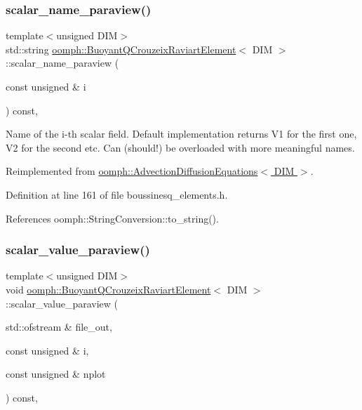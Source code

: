 \subsubsection{\texorpdfstring{scalar\+\_\+name\+\_\+paraview()}{scalar\_name\_paraview()}}
{\footnotesize\ttfamily template$<$unsigned D\+IM$>$ \\
std\+::string \hyperlink{classoomph_1_1BuoyantQCrouzeixRaviartElement}{oomph\+::\+Buoyant\+Q\+Crouzeix\+Raviart\+Element}$<$ D\+IM $>$\+::scalar\+\_\+name\+\_\+paraview (\begin{DoxyParamCaption}\item[{const unsigned \&}]{i }\end{DoxyParamCaption}) const\hspace{0.3cm}{\ttfamily [inline]}, {\ttfamily [virtual]}}



Name of the i-\/th scalar field. Default implementation returns V1 for the first one, V2 for the second etc. Can (should!) be overloaded with more meaningful names. 



Reimplemented from \hyperlink{classoomph_1_1AdvectionDiffusionEquations_a37c30bb64389d12ffef51f046d846886}{oomph\+::\+Advection\+Diffusion\+Equations$<$ D\+I\+M $>$}.



Definition at line 161 of file boussinesq\+\_\+elements.\+h.



References oomph\+::\+String\+Conversion\+::to\+\_\+string().

\mbox{\label{classoomph_1_1BuoyantQCrouzeixRaviartElement_a33130eacdbdee41536fce76166c4a769}} 
\subsubsection{\texorpdfstring{scalar\+\_\+value\+\_\+paraview()}{scalar\_value\_paraview()}}
{\footnotesize\ttfamily template$<$unsigned D\+IM$>$ \\
void \hyperlink{classoomph_1_1BuoyantQCrouzeixRaviartElement}{oomph\+::\+Buoyant\+Q\+Crouzeix\+Raviart\+Element}$<$ D\+IM $>$\+::scalar\+\_\+value\+\_\+paraview (\begin{DoxyParamCaption}\item[{std\+::ofstream \&}]{file\+\_\+out,  }\item[{const unsigned \&}]{i,  }\item[{const unsigned \&}]{nplot }\end{DoxyParamCaption}) const\hspace{0.3cm}{\ttfamily [inline]}, {\ttfamily [virtual]}}




